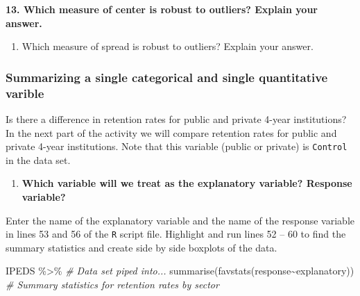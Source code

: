 \documentclass[
]{report}
\newenvironment{Shaded}{\begin{snugshade}}{\end{snugshade}}
\newcommand{\CommentTok}[1]{\textcolor[rgb]{0.56,0.35,0.01}{\textit{#1}}}
\newcommand{\FunctionTok}[1]{\textcolor[rgb]{0.00,0.00,0.00}{#1}}
\newcommand{\NormalTok}[1]{#1}
\newcommand{\SpecialCharTok}[1]{\textcolor[rgb]{0.00,0.00,0.00}{#1}}
\providecommand{\tightlist}{%
  \setlength{\itemsep}{0pt}\setlength{\parskip}{0pt}}
\begin{document}
\vspace{0.8in}

\textbf{13. Which measure of center is robust to outliers? Explain your answer.}

\vspace{0.5in}

\begin{enumerate}
\def\labelenumi{\arabic{enumi}.}
\setcounter{enumi}{13}
\tightlist
\item
  Which measure of spread is robust to outliers? Explain your answer.
\end{enumerate}

\vspace{0.5in}

\hypertarget{summarizing-a-single-categorical-and-single-quantitative-varible}{%
\subsubsection{Summarizing a single categorical and single quantitative varible}\label{summarizing-a-single-categorical-and-single-quantitative-varible}}

Is there a difference in retention rates for public and private 4-year institutions? In the next part of the activity we will compare retention rates for public and private 4-year institutions. Note that this variable (public or private) is \texttt{Control} in the data set.

\begin{enumerate}
\def\labelenumi{\arabic{enumi}.}
\setcounter{enumi}{14}
\tightlist
\item
  \textbf{Which variable will we treat as the explanatory variable? Response variable?}
\end{enumerate}

\vspace{0.8in}

Enter the name of the explanatory variable and the name of the response variable in lines 53 and 56 of the \texttt{R} script file. Highlight and run lines 52 -- 60 to find the summary statistics and create side by side boxplots of the data.

\begin{Shaded}
\begin{Highlighting}[]
\NormalTok{IPEDS }\SpecialCharTok{\%\textgreater{}\%}  \CommentTok{\# Data set piped into...}
  \FunctionTok{summarise}\NormalTok{(}\FunctionTok{favstats}\NormalTok{(response}\SpecialCharTok{\textasciitilde{}}\NormalTok{explanatory)) }\CommentTok{\# Summary statistics for retention rates by sector}
\end{Highlighting}
\end{Shaded}
\end{document}
